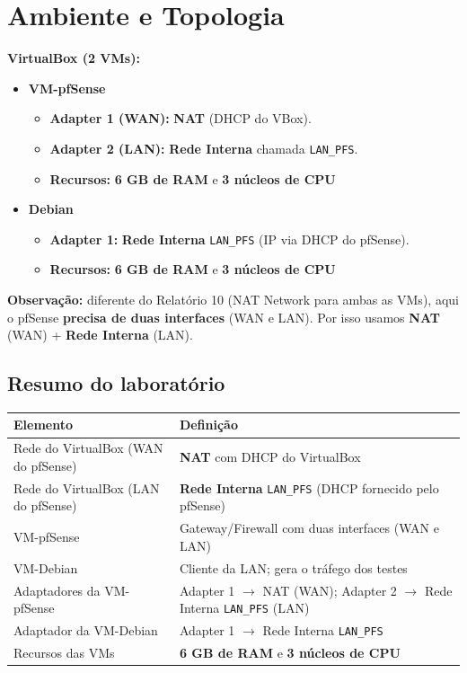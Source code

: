 \section{Ambiente e Topologia}

\textbf{VirtualBox (2 VMs):}
\begin{itemize}
  \item \textbf{VM-pfSense}
  \begin{itemize}
    \item \textbf{Adapter 1 (WAN):} \textbf{NAT} (DHCP do VBox).
    \item \textbf{Adapter 2 (LAN):} \textbf{Rede Interna} chamada \texttt{LAN\_PFS}.
    \item \textbf{Recursos:} \textbf{6 GB de RAM} e \textbf{3 núcleos de CPU}
  \end{itemize}
  \item \textbf{Debian}
  \begin{itemize}
    \item \textbf{Adapter 1:} \textbf{Rede Interna} \texttt{LAN\_PFS} (IP via DHCP do pfSense).
    \item \textbf{Recursos:} \textbf{6 GB de RAM} e \textbf{3 núcleos de CPU}
  \end{itemize}
\end{itemize}


\begin{notebox}
\textbf{Observação:} diferente do Relatório 10 (NAT Network para ambas as VMs), aqui o pfSense \textbf{precisa de duas interfaces} (WAN e LAN). Por isso usamos \textbf{NAT} (WAN) + \textbf{Rede Interna} (LAN).
\end{notebox}

\subsection{Resumo do laboratório}

\begin{tabularx}{\linewidth}{lX}
\toprule
\textbf{Elemento} & \textbf{Definição} \\
\midrule
Rede do VirtualBox (WAN do pfSense) & \textbf{NAT} com DHCP do VirtualBox \\
Rede do VirtualBox (LAN do pfSense) & \textbf{Rede Interna} \texttt{LAN\_PFS} (DHCP fornecido pelo pfSense) \\
VM-pfSense & Gateway/Firewall com duas interfaces (WAN e LAN) \\
VM-Debian & Cliente da LAN; gera o tráfego dos testes \\
Adaptadores da VM-pfSense & Adapter 1 $\rightarrow$ NAT (WAN); Adapter 2 $\rightarrow$ Rede Interna \texttt{LAN\_PFS} (LAN) \\
Adaptador da VM-Debian & Adapter 1 $\rightarrow$ Rede Interna \texttt{LAN\_PFS} \\
Recursos das VMs & \textbf{6 GB de RAM} e \textbf{3 núcleos de CPU} \\
\bottomrule
\end{tabularx}


